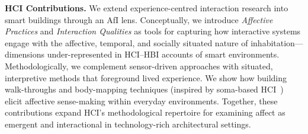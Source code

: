 \textbf{HCI Contributions.} We extend experience-centred interaction research into smart buildings through an AfI lens. Conceptually, we introduce \emph{Affective Practices} and \emph{Interaction Qualities} as tools for capturing how interactive systems engage with the affective, temporal, and socially situated nature of inhabitation---dimensions under-represented in HCI–HBI accounts of smart environments. Methodologically, we complement sensor-driven approaches with situated, interpretive methods that foreground lived experience. We show how building walk-throughs and body-mapping techniques (inspired by soma-based HCI~\cite{hook2018designing}) elicit affective sense-making within everyday environments. Together, these contributions expand HCI’s methodological repertoire for examining affect as emergent and interactional in technology-rich architectural settings.








